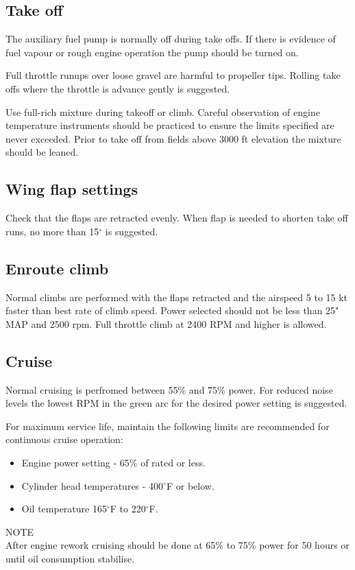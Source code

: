 \subsection{Take off}
The auxiliary fuel pump is normally off during take offs.  If there is evidence of fuel vapour or rough engine operation the pump should be turned on.

Full throttle runups over loose gravel are harmful to propeller tips.  Rolling take offs where the throttle is advance gently is suggested.  

Use full-rich mixture during takeoff or climb. Careful observation of engine temperature instruments should be practiced to ensure the limits specified are never exceeded.
Prior to take off from fields above 3000 ft elevation the mixture should be leaned.


\subsection{Wing flap settings}
Check that the flaps are retracted evenly. When flap is needed to shorten take off runs, no more than 15$^{\circ}$ is suggested.

\subsection{Enroute climb}
Normal climbs are performed with the flaps retracted and the airspeed 5 to 15 kt faster than best rate of climb speed.  Power selected should not be less than 25" MAP and 2500 rpm. Full throttle climb at 2400 RPM and higher is allowed. 

\subsection{Cruise}
Normal cruising is perfromed between 55\% and 75\% power.  
For reduced noise levels the lowest RPM in the green arc for the desired power setting is suggested.

For maximum service life, maintain the following limits are recommended for continuous cruise operation:\\
\begin{itemize}
\item Engine power setting - 65\% of rated or less.
\item Cylinder head temperatures - 400$^{\circ}$F or below.
\item Oil temperature 165$^{\circ}$F to 220$^{\circ}$F.
\end{itemize}
\begin{center}
NOTE\\

After engine rework cruising should be done at 65\% to 75\% power for 50 hours or until oil consumption stabilise.
\end{center}

